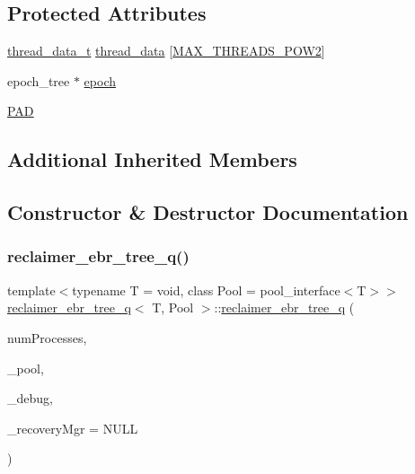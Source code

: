 \subsection*{Protected Attributes}
\begin{DoxyCompactItemize}
\item 
\hyperlink{structthread__data__t}{thread\+\_\+data\+\_\+t} \hyperlink{classreclaimer__ebr__tree__q_a1522f869ac47606c7085daa105fcd4e8}{thread\+\_\+data} \mbox{[}\hyperlink{plaf_8h_ac1585a3455dd3e33e877e588be9e466b}{M\+A\+X\+\_\+\+T\+H\+R\+E\+A\+D\+S\+\_\+\+P\+O\+W2}\mbox{]}
\item 
epoch\+\_\+tree $\ast$ \hyperlink{classreclaimer__ebr__tree__q_a1cfeefd43d11258ff49a59500e2561da}{epoch}
\item 
\hyperlink{classreclaimer__ebr__tree__q_a3ddbd7d6e1ffc0706cf6469479f39014}{P\+AD}
\end{DoxyCompactItemize}
\subsection*{Additional Inherited Members}


\subsection{Constructor \& Destructor Documentation}
\mbox{\label{classreclaimer__ebr__tree__q_ac0243334db596ecc7d41834656cdd59c}} 
\subsubsection{\texorpdfstring{reclaimer\+\_\+ebr\+\_\+tree\+\_\+q()}{reclaimer\_ebr\_tree\_q()}}
{\footnotesize\ttfamily template$<$typename T  = void, class Pool  = pool\+\_\+interface$<$\+T$>$$>$ \\
\hyperlink{classreclaimer__ebr__tree__q}{reclaimer\+\_\+ebr\+\_\+tree\+\_\+q}$<$ T, Pool $>$\+::\hyperlink{classreclaimer__ebr__tree__q}{reclaimer\+\_\+ebr\+\_\+tree\+\_\+q} (\begin{DoxyParamCaption}\item[{const int}]{num\+Processes,  }\item[{Pool $\ast$}]{\+\_\+pool,  }\item[{\hyperlink{classdebugInfo}{debug\+Info} $\ast$const}]{\+\_\+debug,  }\item[{\hyperlink{classRecoveryMgr}{Recovery\+Mgr}$<$ void $\ast$$>$ $\ast$const}]{\+\_\+recovery\+Mgr = {\ttfamily NULL} }\end{DoxyParamCaption})\hspace{0.3cm}{\ttfamily [inline]}}


